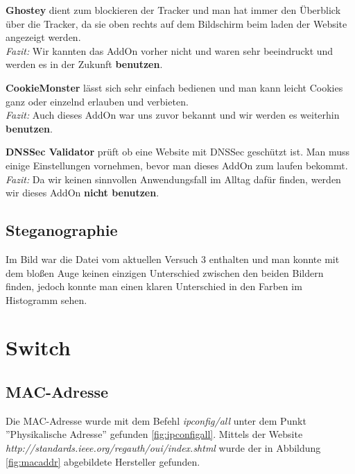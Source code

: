 \documentclass{scrartcl}
\begin{document}
  \textbf{Ghostey} dient zum blockieren der Tracker und man hat immer den Überblick über die Tracker, da sie oben rechts auf dem Bildschirm beim laden der Website angezeigt werden.\\
  \emph{Fazit:} Wir kannten das AddOn vorher nicht und waren sehr beeindruckt und werden es in der Zukunft \textbf{benutzen}.
  
  \textbf{CookieMonster} lässt sich sehr einfach bedienen und man kann leicht Cookies ganz oder einzelnd erlauben und verbieten.\\
  \emph{Fazit:} Auch dieses AddOn war uns zuvor bekannt und wir werden es weiterhin \textbf{benutzen}.
  
  \textbf{DNSSec Validator} prüft ob eine Website mit DNSSec geschützt ist. Man muss einige Einstellungen vornehmen, bevor man dieses AddOn zum laufen bekommt.\\
  \emph{Fazit:} Da wir keinen sinnvollen Anwendungsfall im Alltag dafür finden, werden wir dieses AddOn \textbf{nicht benutzen}.
  
  
  \subsection[Aufgabe 12 Steganographie]{Steganographie}
  
  Im Bild war die Datei vom aktuellen Versuch 3 enthalten und man konnte mit dem bloßen Auge keinen einzigen Unterschied zwischen den beiden Bildern finden, jedoch konnte man einen klaren Unterschied in den Farben im Histogramm sehen.
       
  \newpage
\section[Versuch 4 Switch]{Switch}

  \subsection[Aufgabe 3 MAC-Adresse]{MAC-Adresse}
  
  Die MAC-Adresse wurde mit dem Befehl \textit{ipconfig/all} unter dem Punkt ''Physikalische Adresse'' gefunden \ref{fig:ipconfigall}. Mittels der Website \\ 
  \emph{\textit{ http://standards.ieee.org/regauth/oui/index.shtml}} wurde der in Abbildung \ref{fig:macaddr} abgebildete Hersteller gefunden.  
\end{document}
